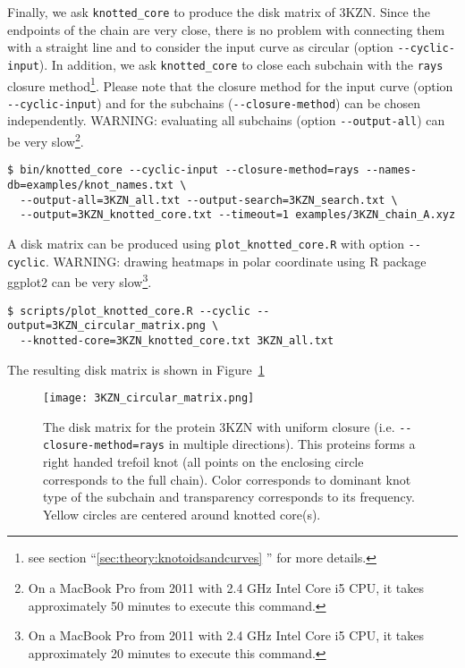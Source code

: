 Finally, we ask \lstinline{knotted_core} to produce the disk matrix of 3KZN. Since the endpoints of the chain are very close, there is no problem with connecting them with a straight line and to consider the input curve as circular (option \lstinline{--cyclic-input}). In addition, we ask \lstinline{knotted_core} to close each subchain with the \lstinline{rays} closure method\footnote{see section ``\ref{sec:theory:knotoidsandcurves} '' for more details.}. Please note that the closure method for the input curve (option \lstinline{--cyclic-input}) and for the subchains (\lstinline{--closure-method}) can be chosen independently. WARNING: evaluating all subchains (option \lstinline{--output-all}) can be very slow\footnote{On a MacBook Pro from 2011 with 2.4 GHz Intel Core i5 CPU, it takes approximately 50 minutes to execute this command.}.
\begin{lstlisting}
$ bin/knotted_core --cyclic-input --closure-method=rays --names-db=examples/knot_names.txt \
  --output-all=3KZN_all.txt --output-search=3KZN_search.txt \
  --output=3KZN_knotted_core.txt --timeout=1 examples/3KZN_chain_A.xyz
\end{lstlisting}

A disk matrix can be produced using \lstinline{plot_knotted_core.R} with option \lstinline{--cyclic}.  WARNING: drawing heatmaps in polar coordinate using {\ttfamily R} package {\ttfamily ggplot2}\cite{wickham2009} can be very slow\footnote{On a MacBook Pro from 2011 with 2.4 GHz Intel Core i5 CPU, it takes approximately 20 minutes to execute this command.}.
\begin{lstlisting}
$ scripts/plot_knotted_core.R --cyclic --output=3KZN_circular_matrix.png \
  --knotted-core=3KZN_knotted_core.txt 3KZN_all.txt
\end{lstlisting}
The resulting disk matrix is shown in Figure~\ref{fig:3KZN:disk}
\begin{figure}[t]
\centering
\texttt{[image: 3KZN\_circular\_matrix.png]}
\caption{The disk matrix for the protein 3KZN with uniform closure (i.e. \lstinline{--closure-method=rays} in multiple directions). This proteins forms a right handed trefoil knot (all points on the enclosing circle corresponds to the full chain). Color corresponds to dominant knot type of the subchain and transparency corresponds to its frequency. Yellow circles are centered around knotted core(s).}\label{fig:3KZN:disk}
\end{figure}



\clearpage
